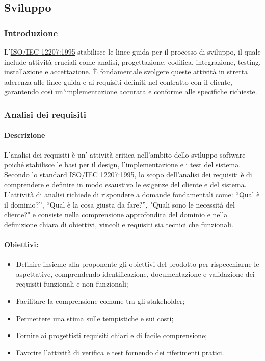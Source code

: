 \subsection{Sviluppo}

\subsubsection{Introduzione}
L'\href{https://www.math.unipd.it/~tullio/IS-1/2009/Approfondimenti/ISO_12207-1995.pdf}{ISO/IEC 12207:1995} stabilisce le linee guida per il processo di sviluppo, il quale include attività cruciali come analisi, progettazione, codifica, integrazione, testing, installazione e accettazione. È fondamentale svolgere queste attività in stretta aderenza alle linee guida e ai requisiti definiti nel contratto con il cliente, garantendo così un'implementazione accurata e conforme alle specifiche richieste.

\subsubsection{Analisi dei requisiti}
\paragraph{Descrizione}
L'analisi dei requisiti è un' attività critica nell'ambito dello sviluppo software poiché stabilisce le basi per il design, l'implementazione e i test del sistema. \\
Secondo lo standard \href{https://www.math.unipd.it/~tullio/IS-1/2009/Approfondimenti/ISO_12207-1995.pdf}{ISO/IEC 12207:1995}, lo scopo dell'analisi dei requisiti è di comprendere e definire in modo esaustivo le esigenze del cliente e del sistema. \\
L’attività di analisi richiede di rispondere a domande fondamentali come: “Qual è il dominio?”, “Qual è la cosa giusta da fare?”, "Quali sono le necessità del cliente?" e consiste nella comprensione approfondita del dominio e nella definizione chiara di obiettivi, vincoli e requisiti sia tecnici che funzionali.
\paragraph{Obiettivi:}
\begin{itemize}
    \item Definire insieme alla proponente gli obiettivi del prodotto per rispecchiarne le aspettative, comprendendo identificazione, documentazione e validazione dei requisiti funzionali e non funzionali;
    \item Facilitare la comprensione comune tra gli stakeholder;
    \item Permettere una stima sulle tempistiche e sui costi;
    \item Fornire ai progettisti requisiti chiari e di facile comprensione;
    \item Favorire l'attività di verifica e test fornendo dei riferimenti pratici.
\end{itemize}

